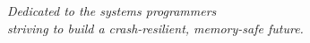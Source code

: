 \thispagestyle{empty}
\vspace*{7cm}
\begin{center}
    \itshape
    Dedicated to the systems programmers\\
    striving to build a crash-resilient, memory-safe future.
\end{center}
\vfill

